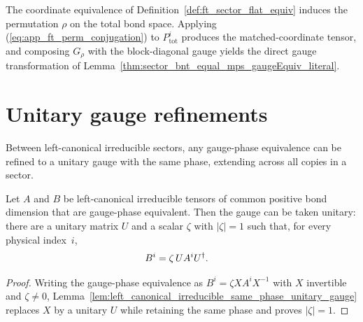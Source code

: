 The coordinate equivalence of Definition~\ref{def:ft_sector_flat_equiv} induces
the permutation $\rho$ on the total bond space. Applying
(\ref{eq:app_ft_perm_conjugation}) to $P_{\mathrm{tot}}^i$ produces the
matched-coordinate tensor, and composing $G_\rho$ with the block-diagonal gauge
yields the direct gauge transformation of
Lemma~\ref{thm:sector_bnt_equal_mps_gaugeEquiv_literal}.

\section{Unitary gauge refinements}
\label{sec:app_ft_unitary_witnesses}

Between left-canonical irreducible sectors, any gauge-phase equivalence can be
refined to a unitary gauge with the same phase, extending across all copies in a
sector.

\begin{lemma}
    \label{lem:left_canonical_irreducible_unitary_gauge}
    \leanok
    Let $A$ and $B$ be left-canonical irreducible tensors of common positive bond
    dimension that are gauge-phase equivalent. Then the gauge can be taken
    unitary: there are a unitary matrix $U$ and a scalar $\zeta$ with
    $|\zeta|=1$ such that, for every physical index~$i$,
    \begin{align}
        B^i & =\zeta\,UA^iU^\dagger. \notag
    \end{align}
\end{lemma}

\begin{proof}\leanok
    Writing the gauge-phase equivalence as $B^i=\zeta XA^iX^{-1}$ with $X$
    invertible and $\zeta\ne0$,
    Lemma~\ref{lem:left_canonical_irreducible_same_phase_unitary_gauge}
    replaces $X$ by a unitary $U$ while retaining the same phase and proves
    $|\zeta|=1$.
\end{proof}

